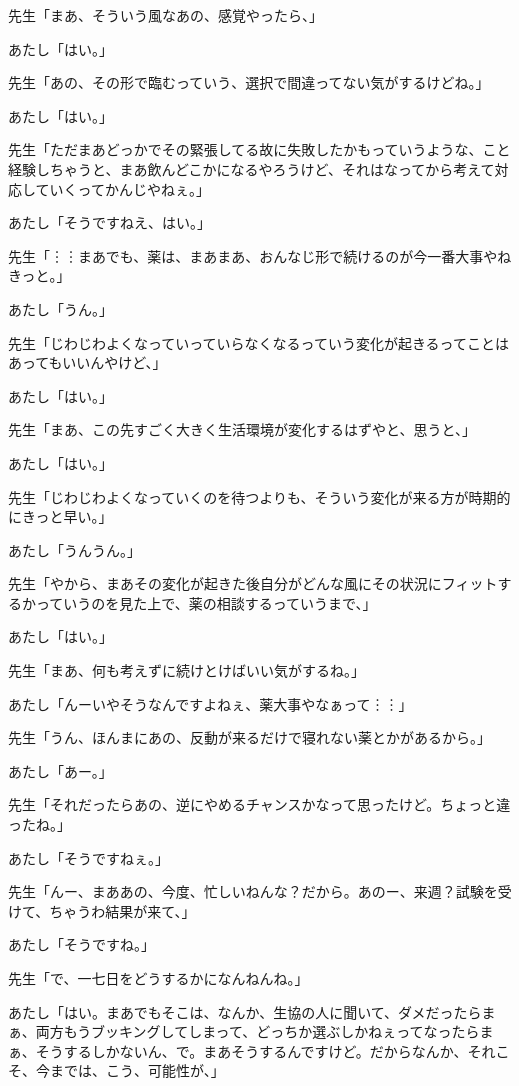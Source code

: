 \documentclass[b5j,twoside,twocolumn]{utarticle}
\begin{document}
\begin{description}
\item 先生「まあ、そういう風なあの、感覚やったら、」
\item あたし「はい。」
\item 先生「あの、その形で臨むっていう、選択で間違ってない気がするけどね。」
\item あたし「はい。」
\item 先生「ただまあどっかでその緊張してる故に失敗したかもっていうような、こと経験しちゃうと、まあ飲んどこかになるやろうけど、それはなってから考えて対応していくってかんじやねぇ。」
\item あたし「そうですねえ、はい。」
\item 先生「︙︙まあでも、薬は、まあまあ、おんなじ形で続けるのが今一番大事やねきっと。」
\item あたし「うん。」
\item 先生「じわじわよくなっていっていらなくなるっていう変化が起きるってことはあってもいいんやけど、」
\item あたし「はい。」
\item 先生「まあ、この先すごく大きく生活環境が変化するはずやと、思うと、」
\item あたし「はい。」
\item 先生「じわじわよくなっていくのを待つよりも、そういう変化が来る方が時期的にきっと早い。」
\item あたし「うんうん。」
\item 先生「やから、まあその変化が起きた後自分がどんな風にその状況にフィットするかっていうのを見た上で、薬の相談するっていうまで、」
\item あたし「はい。」
\item 先生「まあ、何も考えずに続けとけばいい気がするね。」
\item あたし「んーいやそうなんですよねぇ、薬大事やなぁって︙︙」
\item 先生「うん、ほんまにあの、反動が来るだけで寝れない薬とかがあるから。」
\item あたし「あー。」
\item 先生「それだったらあの、逆にやめるチャンスかなって思ったけど。ちょっと違ったね。」
\item あたし「そうですねぇ。」
\item 先生「んー、まああの、今度、忙しいねんな？だから。あのー、来週？試験を受けて、ちゃうわ結果が来て、」
\item あたし「そうですね。」
\item 先生「で、一七日をどうするかになんねんね。」
\item あたし「はい。まあでもそこは、なんか、生協の人に聞いて、ダメだったらまぁ、両方もうブッキングしてしまって、どっちか選ぶしかねぇってなったらまぁ、そうするしかないん、で。まあそうするんですけど。だからなんか、それこそ、今までは、こう、可能性が、」

\end{description}
\end{document}
